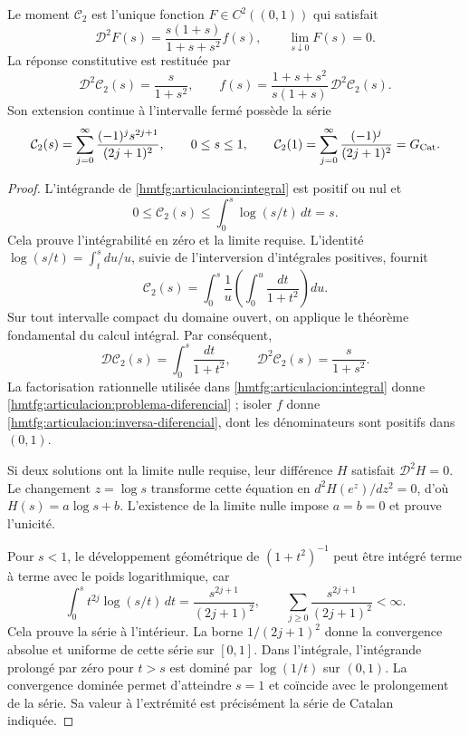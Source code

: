 \begin{proposition}
\label{hmtfg:articulacion:restitucion-catalan}
Le moment \(\mathcal C_2\) est l’unique fonction
\(F\in C^2((0,1))\) qui satisfait
\begin{equation}
 \mathcal D^2F(s)=\frac{s(1+s)}{1+s+s^2}f(s),\qquad
 \lim_{s\downarrow0}F(s)=0.
 \label{hmtfg:articulacion:problema-diferencial}
\end{equation}
La réponse constitutive est restituée par
\begin{equation}
 \mathcal D^2\mathcal C_2(s)=\frac{s}{1+s^2},\qquad
 f(s)=\frac{1+s+s^2}{s(1+s)}\,
          \mathcal D^2\mathcal C_2(s).
 \label{hmtfg:articulacion:inversa-diferencial}
\end{equation}
Son extension continue à l’intervalle fermé possède la série
\begin{equation}
 \mathcal C_2(s)=\sum_{j=0}^{\infty}
       \frac{(-1)^j s^{2j+1}}{(2j+1)^2},\qquad 0\le s\le1,
 \qquad
 \mathcal C_2(1)=\sum_{j=0}^{\infty}\frac{(-1)^j}{(2j+1)^2}
 =G_{\rm Cat}.
 \label{hmtfg:articulacion:serie-catalan}
\end{equation}
\end{proposition}
\begin{proof}
L’intégrande de \eqref{hmtfg:articulacion:integral} est positif ou nul
et
\[
 0\le\mathcal C_2(s)\le\int_0^s\log(s/t)\,dt=s.
\]
Cela prouve l’intégrabilité en zéro et la limite requise.
L’identité \(\log(s/t)=\int_t^s du/u\), suivie de
l’interversion d’intégrales positives, fournit
\[
 \mathcal C_2(s)
 =\int_0^s\frac1u\left(\int_0^u\frac{dt}{1+t^2}\right)du.
\]
Sur tout intervalle compact du domaine ouvert, on applique le
théorème fondamental du calcul intégral. Par conséquent,
\[
 \mathcal D\mathcal C_2(s)=\int_0^s\frac{dt}{1+t^2},
 \qquad
 \mathcal D^2\mathcal C_2(s)=\frac{s}{1+s^2}.
\]
La factorisation rationnelle utilisée dans
\eqref{hmtfg:articulacion:integral} donne
\eqref{hmtfg:articulacion:problema-diferencial} ; isoler \(f\)
donne \eqref{hmtfg:articulacion:inversa-diferencial}, dont les
dénominateurs sont positifs dans \((0,1)\).

Si deux solutions ont la limite nulle requise, leur différence
\(H\) satisfait \(\mathcal D^2H=0\). Le changement \(z=\log s\)
transforme cette équation en \(d^2H(e^z)/dz^2=0\), d’où
\(H(s)=a\log s+b\). L’existence de la limite nulle impose
\(a=b=0\) et prouve l’unicité.

Pour \(s<1\), le développement géométrique de \((1+t^2)^{-1}\)
peut être intégré terme à terme avec le poids logarithmique, car
\[
 \int_0^s t^{2j}\log(s/t)\,dt
 =\frac{s^{2j+1}}{(2j+1)^2},\qquad
 \sum_{j\ge0}\frac{s^{2j+1}}{(2j+1)^2}<\infty.
\]
Cela prouve la série à l’intérieur. La borne
\(1/(2j+1)^2\) donne la convergence absolue et uniforme de cette
série sur \([0,1]\). Dans l’intégrale, l’intégrande prolongé
par zéro pour \(t>s\) est dominé par \(\log(1/t)\)
sur \((0,1)\). La convergence dominée permet d’atteindre
\(s=1\) et coïncide avec le prolongement de la série. Sa valeur
à l’extrémité est précisément la série de Catalan indiquée.
\end{proof}

